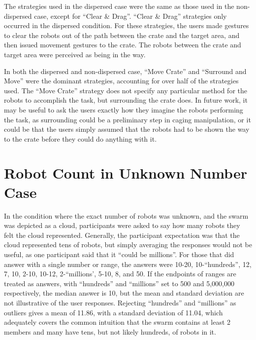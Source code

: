The strategies used in the dispersed case were the same as those used in the non-dispersed case, except for ``Clear \& Drag''.
``Clear \& Drag'' strategies only occurred in the dispersed condition. 
For these strategies, the users made gestures to clear the robots out of the path between the crate and the target area, and then issued movement gestures to the crate. 
The robots between the crate and target area were perceived as being in the way. 

In both the dispersed and non-dispersed case, ``Move Crate'' and ``Surround and Move'' were the dominant strategies, accounting for over half of the strategies used. 
The ``Move Crate'' strategy does not specify any particular method for the robots to accomplish the task, but surrounding the crate does. 
In future work, it may be useful to ask the users exactly how they imagine the robots performing the task, as surrounding could be a preliminary step in caging manipulation, or it could be that the users simply assumed that the robots had to be shown the way to the crate before they could do anything with it. 

%
\section{Robot Count in Unknown Number Case} \label{section:Robot_Count_in_Unknown_Number_Case}

In the condition where the exact number of robots was unknown, and the swarm was depicted as a cloud, participants were asked to say how many robots they felt the cloud represented. 
Generally, the participant expectation was that the cloud represented tens of robots, but simply averaging the responses would not be useful, as one participant said that it ``could be millions''. 
For those that did answer with a single number or range, the answers were 10-20, 10-``hundreds'', 12, 7, 10, 2-10, 10-12, 2-``millions', 5-10, 8, and 50. 
If the endpoints of ranges are treated as answers, with ``hundreds'' and ``millions'' set to 500 and 5,000,000 respectively, the median answer is 10, but the mean and standard deviation are not illustrative of the user responses. 
Rejecting ``hundreds'' and ``millions'' as outliers gives a mean of 11.86, with a standard deviation of 11.04, which adequately covers the common intuition that the swarm contains at least 2 members and many have tens, but not likely hundreds, of robots in it.

